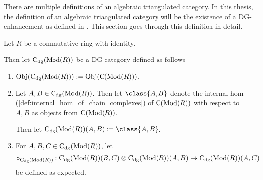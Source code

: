 There are multiple definitions of an algebraic triangulated category. In this thesis, the definition of an algebraic triangulated category will be the existence of a DG-enhancement as defined in \cite[Definition 3.1.3]{Jasso-Muro_2023}. This section goes through this definition in detail.

\begin{definition}[\( \C_{\dg}(\Mod(R)) \)]
    Let \( R \) be a commutative ring with identity.

    Then let \emph{\( \C_{\dg}(\Mod(R)) \)} be a DG-category defined as follows
    \begin{enumerate}
        \item {
            \( \operatorname{Obj}(\operatorname{C}_{\operatorname{dg}}(\operatorname{Mod}(R))) := \operatorname{Obj}(\operatorname{C}(\operatorname{Mod}(R))) \).
        }
        \item {
            Let \( A, B \in \operatorname{C}_{\operatorname{dg}}(\operatorname{Mod}(R)) \). Then let \( \class{A, B} \) denote the internal hom (\autoref{def:internal_hom_of_chain_complexes}) of \( \operatorname{C}(\operatorname{Mod}(R)) \) with respect to \( A, B \) as objects from \( \operatorname{C}(\operatorname{Mod}(R)) \).

            Then let \( \C_{\dg}(\Mod(R))(A, B) := \class{A, B} \).

        }
        \item {
            For \( A, B, C \in \operatorname{C}_{\operatorname{dg}}(\operatorname{Mod}(R)) \), let
            \[
                \circ_{\operatorname{C}_{\operatorname{dg}}(\operatorname{Mod}(R))}: \operatorname{C}_{\operatorname{dg}}(\operatorname{Mod}(R))(B, C) \otimes \operatorname{C}_{\operatorname{dg}}(\operatorname{Mod}(R))(A, B) \to \operatorname{C}_{\operatorname{dg}}(\operatorname{Mod}(R))(A, C)
            \]
            be defined as expected.
        }
    \end{enumerate}
\end{definition}

